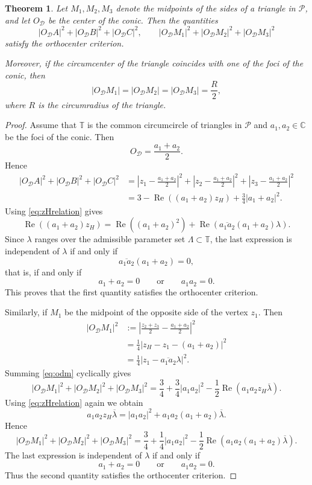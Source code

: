 \documentclass[11pt,reqno]{amsart}
\newtheorem{theorem}{Theorem}[section]
\theoremstyle{definition}
\numberwithin{equation}{section}
\begin{document}
\begin{theorem}\label{thm:midptdist}
Let $M_1,M_2,M_3$ denote the midpoints of the sides of a triangle in $\mathcal P$, and let $O_{\mathcal D}$ be the center of the conic. Then the quantities
\[
|O_{\mathcal D}A|^2+|O_{\mathcal D}B|^2+|O_{\mathcal D}C|^2, \qquad |O_{\mathcal D}M_1|^2+|O_{\mathcal D}M_2|^2+|O_{\mathcal D}M_3|^2
\]
satisfy the orthocenter criterion.

Moreover, if the circumcenter of the triangle coincides with one of the foci of the conic, then
\[
|O_{\mathcal D}M_1|
=
|O_{\mathcal D}M_2|
=
|O_{\mathcal D}M_3|
=
\frac{R}{2},
\]
where $R$ is the circumradius of the triangle.
\end{theorem}

\begin{proof}
Assume that $\mathbb T$ is the common circumcircle of triangles in $\mathcal P$ and $a_1,a_2 \in \mathbb C$ be the foci of the conic. Then
\[
O_{\mathcal D}=\frac{a_1+a_2}{2}.
\]
Hence
\begin{align*}
|O_{\mathcal D}A|^2+|O_{\mathcal D}B|^2+|O_{\mathcal D}C|^2
&=\left|
z_1-\frac{a_1+a_2}{2}
\right|^2+\left|
z_2-\frac{a_1+a_2}{2}
\right|^2+\left|
z_3-\frac{a_1+a_2}{2}
\right|^2 \\
&=
3-\operatorname{Re}((a_1+a_2)z_H)+\frac34
|a_1+a_2|^2.
\end{align*}
Using \eqref{eq:zHrelation} gives
\[
\operatorname{Re}((a_1+a_2)z_H)=\operatorname{Re}((a_1+a_2)^2)+\operatorname{Re}(\overline{a_1a_2}(a_1+a_2)\lambda).
\]
Since $\lambda$ ranges over the admissible parameter set $\Lambda \subset \mathbb T$, the last expression is independent of $\lambda$ if and only if
\[
\overline{a_1a_2}(a_1+a_2)=0,
\]
that is, if and only if
\[
a_1+a_2=0
\qquad\text{or}\qquad
a_1a_2=0.
\]
This proves that the first quantity satisfies the orthocenter criterion.

Similarly, if $M_1$ be the midpoint of the opposite side of the vertex $z_1$. Then
\begin{align}
|O_{\mathcal D}M_1|^2
&:=\left|
\frac{z_2+z_3}{2}-\frac{a_1+a_2}{2}
\right|^2 \nonumber \\
&=
\frac14\left|z_H-z_1-(a_1+a_2)\right|^2  \nonumber\\
&=
\frac14\left|z_1-\overline{a_1a_2} \lambda\right|^2 \label{eq:odm}.
\end{align}
Summing \eqref{eq:odm} cyclically gives
\[
|O_{\mathcal D}M_1|^2+|O_{\mathcal D}M_2|^2+|O_{\mathcal D}M_3|^2
=
\frac34+\frac34|a_1a_2|^2
-\frac12
\operatorname{Re}
\left(
a_1a_2z_H\overline{\lambda}
\right).
\]
Using \eqref{eq:zHrelation} again we obtain
\[
a_1a_2z_H\overline{\lambda}
=
|a_1a_2|^2
+
a_1a_2(a_1+a_2)\overline{\lambda}.
\]
Hence
\[
|O_{\mathcal D}M_1|^2+|O_{\mathcal D}M_2|^2+|O_{\mathcal D}M_3|^2
=
\frac34+\frac14|a_1a_2|^2
-\frac12
\operatorname{Re}
\left(
a_1a_2(a_1+a_2)\overline{\lambda}
\right).
\]
The last expression is independent of $\lambda$ if and only if
\[
a_1+a_2=0
\qquad\text{or}\qquad
a_1a_2=0.
\] 
Thus the second quantity satisfies the orthocenter criterion.


\end{proof}
\end{document}
